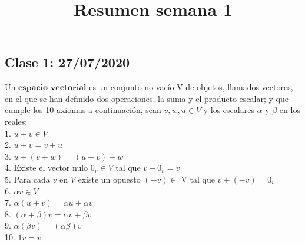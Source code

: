 \documentclass[secnumarabic,balancelastpage,amsmath,amssymb]{article}
\title{Resumen semana 1}
\begin{document}
\subsection{Clase 1: 27/07/2020}

Un $\textbf{espacio vectorial}$ es un conjunto no vacío V de objetos, llamados vectores, en el que se han definido dos operaciones, la suma y el producto escalar; y que cumple los 10 axiomas a continuación, sean $v, w, u \in V$ y los escalares $\alpha$ y $\beta$ en los reales: \\

1. $u+v \in V$\\
2. $u+v=v+u$\\
3. $u+(v+w)=(u+v)+w$\\
4. Existe el vector nulo $0_{v} \in V$ tal que $v+ 0_{v} =v $\\
5. Para cada $v$ en $V$ existe un opuesto $(-v) \in$ V tal que $v + (-v) = 0_{v}$\\
6. $\alpha v \in V $\\
7. $\alpha (u+v) = \alpha u +\alpha v$\\
8. $(\alpha +\beta) v = \alpha v + \beta v$\\
9. $\alpha(\beta v)=(\alpha \beta) v$\\
10. $1v =v$\\\\
\end{document}
